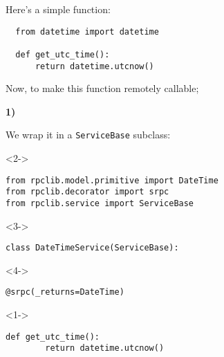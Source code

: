 \documentclass{beamer}
\begin{document}
\begin{frame}[fragile]
  \LARGE
\begin{center}

  Here's a simple function:

  \bigskip

  \bigskip

  \large

  \begin{lstlisting}
  from datetime import datetime

  def get_utc_time():
      return datetime.utcnow()
  \end{lstlisting}

\end{center}
\end{frame}

\begin{frame}
  \LARGE

  Now, to make this function remotely callable;

  \bigskip

\pause

  \color{red} \textbf{1)} \color{black}


    \begin{center}
      We wrap it in a \texttt{ServiceBase} subclass:
    \end{center}

\end{frame}

\begin{frame}[fragile]
\begin{uncoverenv}<2->
  \begin{lstlisting}[frame=none]
from rpclib.model.primitive import DateTime
from rpclib.decorator import srpc
from rpclib.service import ServiceBase
  \end{lstlisting}
\end{uncoverenv}
\begin{uncoverenv}<3->
  \begin{lstlisting}[frame=none]
class DateTimeService(ServiceBase):
  \end{lstlisting}
  \vspace{-13pt}
\end{uncoverenv}
\begin{uncoverenv}<4->
  \begin{lstlisting}[frame=none]
    @srpc(_returns=DateTime)
  \end{lstlisting}
  \vspace{-13pt}
\end{uncoverenv}
\begin{uncoverenv}<1->
  \begin{lstlisting}[frame=none]
    def get_utc_time():
        return datetime.utcnow()
  \end{lstlisting}
\end{uncoverenv}
\end{frame}
\end{document}
